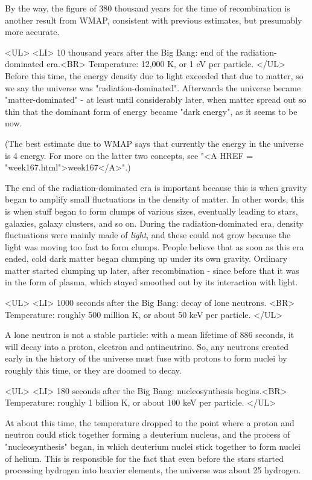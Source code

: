 By the way, the figure of 380 thousand years for the time of
recombination is another result from WMAP, consistent with previous
estimates, but presumably more accurate.

<UL>
<LI>
10 thousand years after the Big Bang: end of the radiation-dominated era.<BR>
Temperature: 12,000 K, or 1 eV per particle.
</UL>
Before this time, the energy density due to light exceeded that due to
matter, so we say the universe was "radiation-dominated".  Afterwards
the universe became "matter-dominated" - at least until considerably
later, when matter spread out so thin that the dominant form of energy
became "dark energy", as it seems to be now.

(The best estimate due to WMAP says that currently the energy in the
universe is 4%
energy.  For more on the latter two concepts, see "<A HREF = "week167.html">week167</A>".)

The end of the radiation-dominated era is important because this is
when gravity began to amplify small fluctuations in the density of
matter.  In other words, this is when stuff began to form clumps of
various sizes, eventually leading to stars, galaxies, galaxy clusters,
and so on.  During the radiation-dominated era, density fluctuations
were mainly made of \emph{light}, and these could not grow because the
light was moving too fast to form clumps.  People believe that as soon
as this era ended, cold dark matter began clumping up under its own
gravity.  Ordinary matter started clumping up later, after
recombination - since before that it was in the form of plasma, 
which stayed smoothed out by its interaction with light.

<UL>
<LI>
1000 seconds after the Big Bang: decay of lone neutrons.   <BR>
Temperature: roughly 500 million K, or about 50 keV per particle.
</UL>

A lone neutron is not a stable particle: with a mean lifetime of 886
seconds, it will decay into a proton, electron and antineutrino.  So,
any neutrons created early in the history of the universe must fuse
with protons to form nuclei by roughly this time, or they are doomed
to decay.

<UL>
<LI>
180 seconds after the Big Bang: nucleosynthesis begins.<BR>
Temperature: roughly 1 billion K, or about 100 keV per particle.
</UL>

At about this time, the temperature dropped to the point where a proton
and neutron could stick together forming a deuterium nucleus, and the
process of "nucleosynthesis" began, in which deuterium nuclei stick
together to form nuclei of helium.  This is responsible for the fact
that even before the stars started processing hydrogen into heavier
elements, the universe was about 25%
hydrogen.

